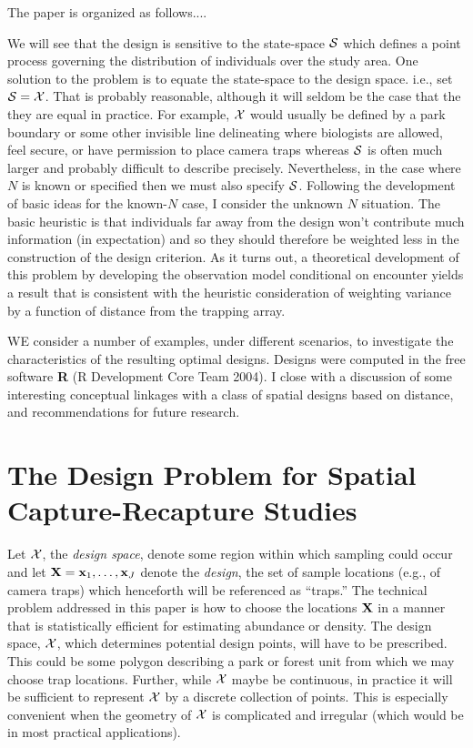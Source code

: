 \documentclass[useAMS,referee]{biom}
\begin{document}
The paper is organized as follows....

We will see that the design is sensitive to the
state-space ${\cal S}$ which defines a point process governing the
distribution of individuals over the study area.  One solution to the
problem is to equate the state-space to the design space. i.e., set
${\cal S} = {\cal X}$.
  That is probably reasonable, although it will
seldom be the case that the they are equal in practice. For example,
${\cal X}$ would usually be defined by a park boundary or some other invisible
line delineating where biologists are allowed, feel secure, or have
permission to place camera traps whereas ${\cal S}$ is often much
larger and probably difficult to describe precisely. Nevertheless, in
the case where $N$ is known or specified then we must also specify
${\cal S}$.  Following the development of basic ideas for the
known-$N$ case, I consider the unknown $N$ situation.  The basic
heuristic is that individuals far away from the design won't
contribute much information (in expectation) and so they should
therefore be weighted less in the construction of the design
criterion.  As it turns out, a theoretical development of this problem
by developing the observation model conditional on encounter yields a
result that is consistent with the heuristic consideration of
weighting variance by a function of distance from the trapping array.

WE consider a number of examples, under different scenarios, to
investigate the characteristics of the resulting optimal designs.  
Designs were computed in the free software {\bf R} (R Development Core
Team 2004).  I close with a discussion of some interesting conceptual
linkages with a class of spatial designs based on distance, and
recommendations for future research.




\section{The Design Problem for Spatial Capture-Recapture Studies}
\label{sec.design}

Let ${\cal X}$, the {\it design space}, denote some region within
which sampling could occur and let ${\bf X} = {\bf x}_{1},\ldots, {\bf
  x}_{J}$ denote the {\it design}, the set of sample locations (e.g.,
of camera traps) which henceforth will be referenced as ``traps.'' The
technical problem addressed in this paper is how to choose the
locations ${\bf X}$ in a manner that is statistically efficient for
estimating abundance or density.  The design space, ${\cal X}$, which
determines potential design points, will have to be prescribed.  This
could be some polygon describing a park or forest unit from which
we may choose trap locations.  Further, while ${\cal X}$ maybe be
continuous, 
in practice it will be sufficient to represent ${\cal X}$ by a
discrete collection of points.  This is especially convenient when
the geometry of ${\cal X}$ is complicated and irregular (which would
be in most practical applications).
\end{document}
